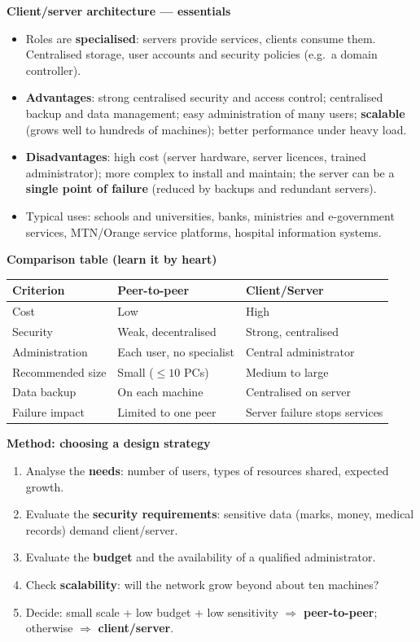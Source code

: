 \documentclass[11pt]{article}
\begin{document}
\begin{bilan}
\textbf{Client/server architecture — essentials}
\begin{itemize}
\item Roles are \textbf{specialised}: servers provide services, clients consume them. Centralised storage, user accounts and security policies (e.g.\ a domain controller).
\item \textbf{Advantages}: strong centralised security and access control; centralised backup and data management; easy administration of many users; \textbf{scalable} (grows well to hundreds of machines); better performance under heavy load.
\item \textbf{Disadvantages}: high cost (server hardware, server licences, trained administrator); more complex to install and maintain; the server can be a \textbf{single point of failure} (reduced by backups and redundant servers).
\item Typical uses: schools and universities, banks, ministries and e-government services, MTN/Orange service platforms, hospital information systems.
\end{itemize}

\textbf{Comparison table (learn it by heart)}
\begin{center}
\begin{tabularx}{\linewidth}{|l|X|X|}
\hline
\rowcolor{popblueL} \textbf{Criterion} & \textbf{Peer-to-peer} & \textbf{Client/Server} \\
\hline
Cost & Low & High \\
\hline
Security & Weak, decentralised & Strong, centralised \\
\hline
Administration & Each user, no specialist & Central administrator \\
\hline
Recommended size & Small ($\leq 10$ PCs) & Medium to large \\
\hline
Data backup & On each machine & Centralised on server \\
\hline
Failure impact & Limited to one peer & Server failure stops services \\
\hline
\end{tabularx}
\end{center}

\textbf{Method: choosing a design strategy}
\begin{enumerate}
\item Analyse the \textbf{needs}: number of users, types of resources shared, expected growth.
\item Evaluate the \textbf{security requirements}: sensitive data (marks, money, medical records) demand client/server.
\item Evaluate the \textbf{budget} and the availability of a qualified administrator.
\item Check \textbf{scalability}: will the network grow beyond about ten machines?
\item Decide: small scale + low budget + low sensitivity $\Rightarrow$ \textbf{peer-to-peer}; otherwise $\Rightarrow$ \textbf{client/server}.
\end{enumerate}


\end{bilan}
\end{document}
